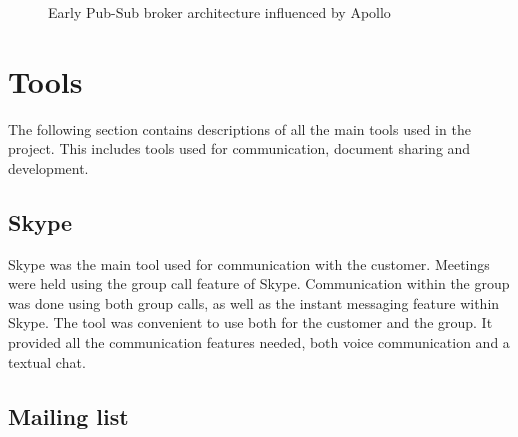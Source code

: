 \begin{center}
  \begin{figure}[ht!]
    \caption{Early Pub-Sub broker architecture influenced by Apollo}
    \label{fig:arch_proposal}
  \end{figure}
\end{center}

\section{Tools}
\label{sec:prestudies-tools}

The following section contains descriptions of all the main tools used in the project. This includes tools used for communication, document sharing and development.

\subsection{Skype}
\label{subsec:prestudies-tools-skype}

Skype \cite{skype} was the main tool used for communication with the customer. Meetings were held using the group call feature of Skype. Communication within the group was done using both group calls, as well as the instant messaging feature within Skype. The tool was convenient to use both for the customer and the group. It provided all the communication features needed, both voice communication and a textual chat.

\subsection{Mailing list}
\label{subsec:prestudies-tools-mailinglist}

